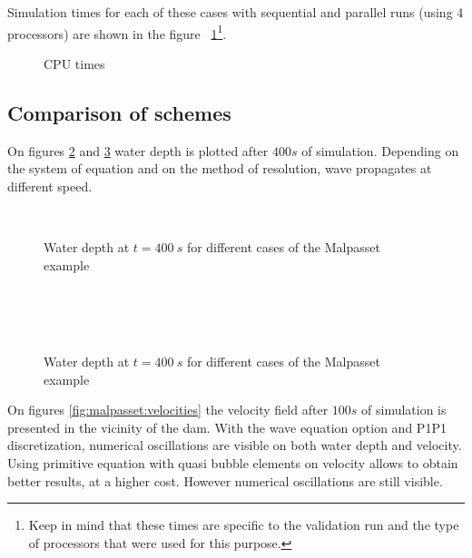 Simulation times for each of these cases with sequential and parallel runs (using 4 processors) are shown in the figure ~\ref{fig:malpasset:cputime}\footnote{Keep in mind that these times
are specific to the validation run and the type of processors that were used for this purpose.}.

\begin{figure}[h!]
  \centering
  \caption{CPU times}\label{fig:malpasset:cputime}
\end{figure}

\subsection{Comparison of schemes}

On figures \ref{fig:malpasset:WD_all1} and \ref{fig:malpasset:WD_all2} water depth is plotted after $400s$ of simulation.
Depending on the system of equation and on the method of resolution, wave propagates at different speed.

\begin{figure}[H]
  \centering
  \\
  \caption{Water depth at $t=400~s$ for different cases of the Malpasset example}\label{fig:malpasset:WD_all1}
\end{figure}

\begin{figure}[H]
  \centering
  \\
  \\
  \\
  \caption{Water depth at $t=400~s$ for different cases of the Malpasset example}\label{fig:malpasset:WD_all2}
\end{figure}

On figures \ref{fig:malpasset:velocities} the velocity field after $100s$ of simulation is presented
in the vicinity of the dam. With the wave equation option and P1P1 discretization,
numerical oscillations are visible on both water depth and velocity.
Using primitive equation with quasi bubble elements on velocity allows to obtain better results, at a higher cost.
However numerical oscillations are still visible.

